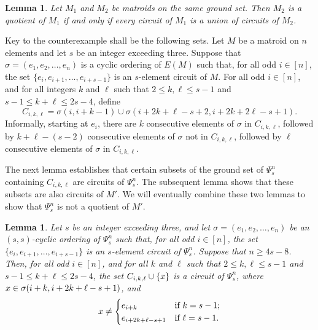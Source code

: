 \documentclass[11pt]{amsart}
\newtheorem{lemma}[theorem]{Lemma}
\newcommand{\blue}{\textcolor{black}}
\newcommand{\bloo}{\textcolor{black}}
\begin{document}
\begin{lemma}
Let $M_1$ and $M_2$ be matroids on the same ground set. Then $M_2$ is a quotient of $M_1$ if and only if every circuit of $M_1$ is a union of circuits of $M_2$.
\label{quotient}
\end{lemma}

Key to the counterexample shall be the following sets. Let $M$ be a matroid on $n$ elements and let $s$ be an integer exceeding three. Suppose that $\left.\sigma=(e_1, e_2, \ldots, e_n)\right.$ is a cyclic ordering of $E(M)$ such that, for all odd $i\in [n]$, the set $\{e_i, e_{i+1}, \ldots, e_{i+s-1}\}$ is an $s$-element circuit of $M$. For all odd $i \in [n]$, and for all integers $k$ and $\ell$ such that $2 \leq k,\ell \leq s-1$ and $s-1 \leq k+\ell \leq 2s-4$, define
\[C_{i, k, \ell} = \sigma(i, i+k-1) \cup \sigma(i+2k+\ell-s+2, i+2k+2\ell-s+1).\]
Informally, \blue{starting at $e_i$}, there are $k$ consecutive elements of $\sigma$ in $C_{i, k, \ell}$, followed by $k+\ell-(s-2)$ consecutive elements of $\sigma$ not in $C_{i, k, \ell}$, followed by $\ell$ consecutive elements of $\sigma$ in $C_{i, k, \ell}$.

The next lemma establishes that certain subsets of the ground set of $\Psi^n_s$ containing $C_{i, k, \ell}$ are circuits of $\Psi^n_s$. The subsequent lemma shows that these subsets are also circuits of $M'$. We will eventually combine these two lemmas to show that $\Psi^n_s$ is not a quotient of $M'$.

\begin{lemma}
Let $s$ be an integer exceeding three, and let $\sigma=(e_1, e_2, \ldots, e_n)$ be an $(s, s)$-cyclic ordering of $\Psi^n_s$ such that, for all odd $i\in [n]$, the set $\{e_i, e_{i+1}, \ldots, e_{i+s-1}\}$ is an $s$-element circuit of $\Psi^n_s$. Suppose that $n\ge 4s-8$. Then, for all odd $i\in [n]$, and for all $k$ and $\ell$ such that $2\le k, \ell\le s-1$ and $s-1\le k+\ell\le 2s-4$, the set $C_{i, k, \ell}\cup \{\bloo{x}\}$ is a circuit of $\Psi^n_s$, where $\bloo{x} \in \sigma(i+k,i+2k+\ell-s+1)$, and
$$\bloo{x}\neq
\begin{cases}
e_{i+k} & \mbox{if $k=s-1$}; \\
e_{i+2k+\ell-s+1} & \mbox{if $\ell=s-1$}.
\end{cases}$$
\label{psicircuits}
\end{lemma}
\end{document}
